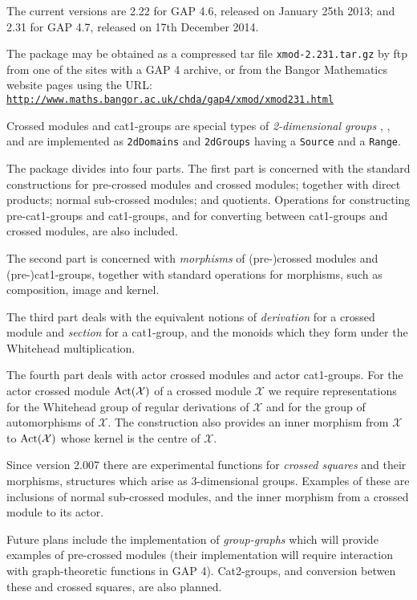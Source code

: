 \documentclass[a4paper,11pt]{report}
\begin{document}
{ The current versions are 2.22 for \textsf{GAP} 4.6, released on January 25th 2013; and 2.31 for \textsf{GAP} 4.7, released on 17th December 2014. 

 The package may be obtained as a compressed tar file \texttt{xmod-2.231.tar.gz} by ftp from one of the sites with a \textsf{GAP} 4 archive, or from the Bangor Mathematics website pages using the URL: \href{http://www.maths.bangor.ac.uk/chda/gap4/xmod/xmod231.html} {\texttt{http://www.maths.bangor.ac.uk/chda/gap4/xmod/xmod231.html}} 

 Crossed modules and cat1-groups are special types of \emph{2-dimensional groups} \cite{B82}, \cite{brow:hig:siv}, and are implemented as \texttt{2dDomains} and \texttt{2dGroups} having a \texttt{Source} and a \texttt{Range}.   

 The package divides into four parts. The first part is concerned with the
standard constructions for pre-crossed modules and crossed modules; together
with direct products; normal sub-crossed modules; and quotients. Operations
for constructing pre-cat1-groups and cat1-groups, and for converting between
cat1-groups and crossed modules, are also included. 

 The second part is concerned with \emph{morphisms} of (pre-)crossed modules and (pre-)cat1-groups, together with standard
operations for morphisms, such as composition, image and kernel. 

 The third part deals with the equivalent notions of \emph{derivation} for a crossed module and \emph{section} for a cat1-group, and the monoids which they form under the Whitehead
multiplication. 

 The fourth part deals with actor crossed modules and actor cat1-groups. For
the actor crossed module ${\rm Act}(\mathcal{X})$ of a crossed module $\mathcal{X}$ we require representations for the Whitehead group of regular derivations of $\mathcal{X}$ and for the group of automorphisms of $\mathcal{X}$. The construction also provides an inner morphism from $\mathcal{X}$ to ${\rm Act}(\mathcal{X})$ whose kernel is the centre of $\mathcal{X}$. 

 Since version 2.007 there are experimental functions for \emph{crossed squares} and their morphisms, structures which arise as $3$-dimensional groups. Examples of these are inclusions of normal sub-crossed
modules, and the inner morphism from a crossed module to its actor. 

 Future plans include the implementation of \emph{group-graphs} which will provide examples of pre-crossed modules (their implementation will
require interaction with graph-theoretic functions in \textsf{GAP} 4). Cat2-groups, and conversion betwen these and crossed squares, are also
planned. 

}
\end{document}
